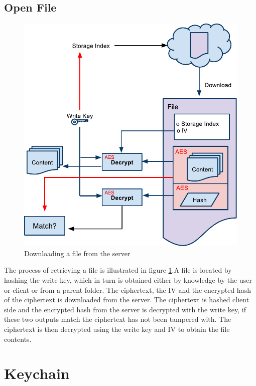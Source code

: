 \documentclass[pdftex,english,10pt,b5paper,twoside]{book}
\begin{document}
\subsection{Open File}
\label{sec:CS:OF}
\begin{figure}[h!]
    \centering
    \includegraphics[width=\columnwidth]{CryptoOpenFile.pdf}
    \caption{Downloading a file from the server}
    \label{fig:CS:OF}
\end{figure}

The process of retrieving a file is illustrated in figure \ref{fig:CS:OF}.A
file is located by hashing the write key, which in turn is obtained either by
knowledge by the user or client or from a parent folder. The ciphertext, the
\ac{IV} and the encrypted hash of the ciphertext is downloaded from the server.
The ciphertext is hashed client side and the encrypted hash from the server is
decrypted with the write key, if these two outputs match the ciphertext has not
been tampered with. The ciphertext is then decrypted using the write key and
\ac{IV} to obtain the file contents.

\section{Keychain}
\end{document}
